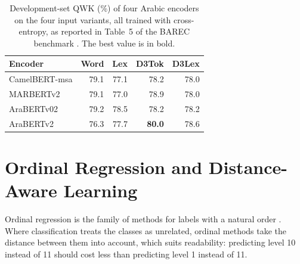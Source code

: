 \begin{table}[H]
\centering
\footnotesize
\caption{Development-set QWK (\%) of four Arabic encoders on the four input variants, all trained
with cross-entropy, as reported in Table~5 of the BAREC benchmark \cite{elmadani2025barec}. The
best value is in bold.}
\label{tab:lit-inputs}
\begin{tabular}{lrrrr}
\toprule
\textbf{Encoder} & \textbf{Word} & \textbf{Lex} & \textbf{D3Tok} & \textbf{D3Lex} \\
\midrule
CamelBERT-msa & 79.1 & 77.1 & 78.2 & 78.0 \\
MARBERTv2 & 79.1 & 77.0 & 78.9 & 78.0 \\
AraBERTv02 & 79.2 & 78.5 & 78.2 & 78.2 \\
AraBERTv2 & 76.3 & 77.7 & \textbf{80.0} & 78.6 \\
\bottomrule
\end{tabular}
\end{table}

\section{Ordinal Regression and Distance-Aware Learning}
\label{sec:lit-ordinal}

Ordinal regression is the family of methods for labels with a natural order
\cite{gutierrez2016ordinal}. Where classification treats the classes as unrelated, ordinal
methods take the distance between them into account, which suits readability: predicting level
10 instead of 11 should cost less than predicting level 1 instead of 11.

